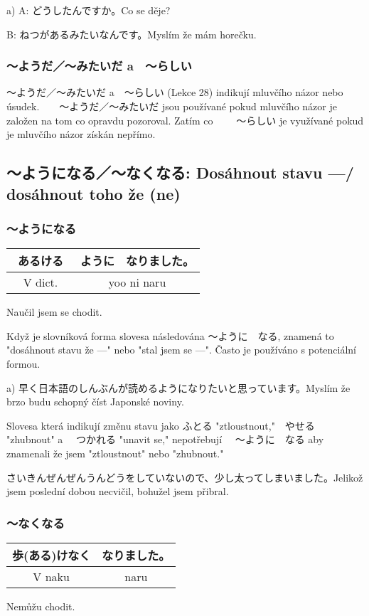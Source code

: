 a) A: どうしたんですか。Co se děje?

B: ねつがあるみたいなんです。Myslím že mám horečku.


\subsubsection{〜ようだ／〜みたいだ a　〜らしい}

〜ようだ／〜みたいだ a　〜らしい (Lekce 28) indikují mluvčího názor nebo úsudek.　　〜ようだ／〜みたいだ jsou používané pokud mluvčího názor je založen na tom co opravdu pozoroval. Zatím co 　　〜らしい je využívané pokud je mluvčího názor získán nepřímo.



\subsection{〜ようになる／〜なくなる: Dosáhnout stavu ---/ dosáhnout toho že (ne)}

\subsubsection{〜ようになる}
\begin{center}
\begin{tabular}{|c|c|}
\hline
あるける　&ように　なりました。\\
\hline
V dict.&yoo ni naru\\
\hline
\end{tabular}
\end{center}
Naučil jsem se chodit.


Když je slovníková forma slovesa následována 〜ように　なる, znamená to "dosáhnout stavu že ---" nebo "stal jsem se ---". Často je používáno s potenciální formou. 

a) 早く日本語のしんぶんが読めるようになりたいと思っています。Myslím že brzo budu schopný číst Japonské noviny.

Slovesa která indikují změnu stavu jako ふとる "ztloustnout,"　やせる "zhubnout" a 　つかれる "unavit se," nepotřebují 　〜ように　なる aby znamenali že jsem "ztloustnout" nebo "zhubnout."

さいきんぜんぜんうんどうをしていないので、少し太ってしまいました。Jelikož jsem poslední dobou necvičil, bohužel jsem přibral.


\subsubsection{ 〜なくなる}
\begin{center}
\begin{tabular}{|c|c|}
\hline
歩(ある)けなく&なりました。\\
\hline
V naku&naru\\
\hline
\end{tabular}
\end{center}
Nemůžu chodit.


